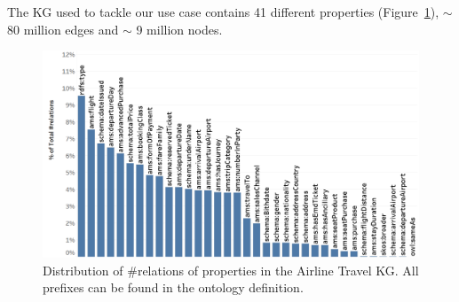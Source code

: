 \documentclass[11pt,dvipdfm]{article}
\begin{document}
The KG used to tackle our use case contains 41 different properties (Figure~\ref{fig:properties}), $\sim$ 80 million edges and $\sim$ 9 million nodes.

\begin{figure}[h]
  \centering
  \includegraphics[width=1.05\linewidth]{submissions/email_marketing/figs/Properties_Distribution.png}
  \caption{Distribution of \#relations of properties in the Airline Travel KG. All prefixes can be found in the ontology definition.}
  \label{fig:properties}
\end{figure}
\end{document}
